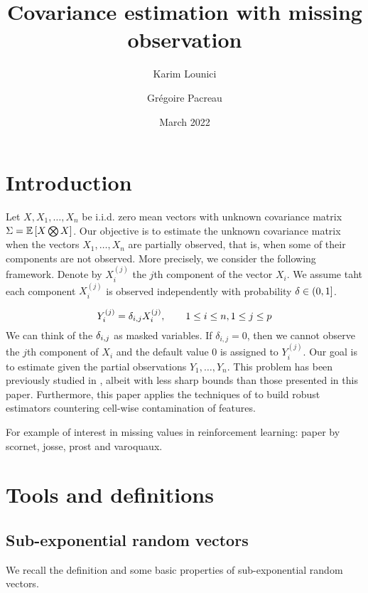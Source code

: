 \documentclass{article}
\title{Covariance estimation with missing observation}
\author{Karim Lounici \and Grégoire Pacreau}
\date{March 2022}
\numberwithin{equation}{section}
\begin{document}
\maketitle

\section{Introduction}

Let $X, X_1, \dots, X_n$ be i.i.d. zero mean vectors with unknown covariance matrix $\Sigma = \mathbb{E}\left[ X \bigotimes X \right]$. Our objective is to estimate the unknown covariance matrix \covariance when the vectors $X_1, \dots, X_n$ are partially observed, that is, when some of their components are not observed. More precisely, we consider the following framework. Denote by $X_i^{(j)}$ the $j$th component of the vector $X_i$. We assume taht each component $X_i^{(j)}$ is observed independently with probability $\delta \in (0,1]$.

\begin{equation}
    Y_i^{(j)} = \delta_{i,j}X_i^{(j)}, \qquad 1 \leq i \leq n, 1\leq j\leq p
\end{equation}
We can think of the $\delta_{i,j}$ as masked variables. If $\delta_{i,j} = 0$, then we cannot observe the $j$th component of $X_i$ and the default value $0$ is assigned to $Y_i^{(j)}$. Our goal is to estimate \covariance given the partial observations $Y_1, \dots, Y_n$. This problem has been previously studied in \cite{louniciHighdimensionalCovarianceMatrix2014}, albeit with less sharp bounds than those presented in this paper. Furthermore, this paper applies the techniques of \cite{louniciHighdimensionalCovarianceMatrix2014} to build robust estimators countering cell-wise contamination of features.

For example of interest in missing values in reinforcement learning: paper by scornet, josse, prost and varoquaux.


\section{Tools and definitions}

    \subsection{Sub-exponential random vectors}
    
    We recall the definition and some basic properties of sub-exponential random vectors.
    
\end{document}
